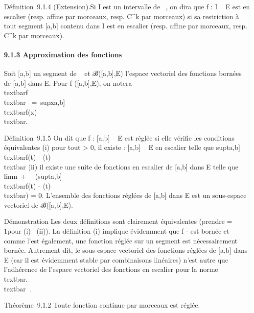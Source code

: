 Définition~9.1.4 (Extension).Si I est un intervalle de ~, on dira que f
: I \rightarrow~ E est en escalier (resp. affine par morceaux, resp. C^k
par morceaux) si sa restriction à tout segment {[}a,b{]} contenu dans I
est en escalier (resp. affine par morceaux, resp. C^k par
morceaux).

\paragraph{9.1.3 Approximation des fonctions}

Soit {[}a,b{]} un segment de ~ et ℬ({[}a,b{]},E) l'espace vectoriel des
fonctions bornées de {[}a,b{]} dans E. Pour f ({[}a,b{]},E), on notera
\\textbar{}f\\textbar{}\infty~
=\
supx\in{[}a,b{]}\\textbar{}f(x)\\textbar{}.

Définition~9.1.5 On dit que f : {[}a,b{]} \rightarrow~ E est réglée si elle vérifie
les conditions équivalentes (i) pour tout \epsilon \textgreater{} 0, il existe
\phi : {[}a,b{]} \rightarrow~ E en escalier telle que
supt\in{[}a,b{]}~\\textbar{}f(t)
- \phi(t)\\textbar{} \leq \epsilon (ii) il existe une suite
\phin de fonctions en escalier de {[}a,b{]} dans E telle que
limn\rightarrow~+\infty~~\left
(supt\in{[}a,b{]}~\\textbar{}f(t)
- \phin(t)\\textbar{}\right ) = 0.
L'ensemble des fonctions réglées de {[}a,b{]} dans E est un sous-espace
vectoriel de ℬ({[}a,b{]},E).

Démonstration Les deux définitions sont clairement équivalentes (prendre
\epsilon = 1\diagupn pour (i) \rigtharrow~(ii)). La définition (i) implique évidemment que f - \phi
est bornée et comme \phi l'est également, une fonction réglée sur un
segment est nécessairement bornée. Autrement dit, le sous-espace
vectoriel des fonctions réglées de {[}a,b{]} dans E (car il est
évidemment stable par combinaisons linéaires) n'est autre que
l'adhérence de l'espace vectoriel des fonctions en escalier pour la
norme \\textbar{}.\\textbar{}\infty~.

Théorème~9.1.2 Toute fonction continue par morceaux est réglée.

